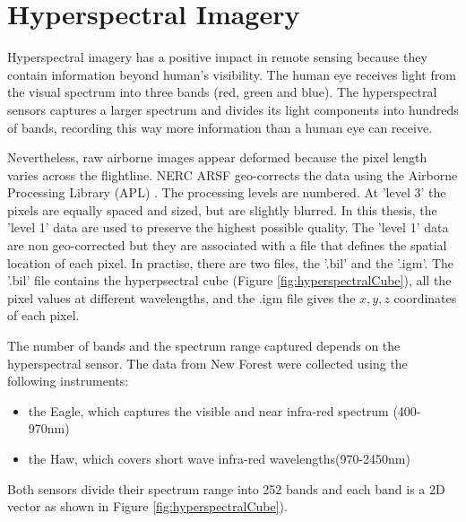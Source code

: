 \documentclass{subfiles}
\begin{document}
	\section{Hyperspectral Imagery}\label{sec:HyperspectralImages}
	\par Hyperspectral imagery has a positive impact in remote sensing because they contain information beyond human's visibility. The human eye receives light from the visual spectrum into three bands (red, green and blue). The hyperspectral sensors captures a larger spectrum and divides its light components into hundreds of bands, recording this way more information than a human eye can receive\cite{Smith2012}. 
	
	\par Nevertheless, raw airborne images  appear deformed because the pixel length varies across the flightline. NERC ARSF geo-corrects the data using the Airborne Processing Library (APL) \cite{Warren2014}. The processing levels are numbered. At 'level 3' the pixels are equally spaced and sized, but are slightly blurred. In this thesis, the 'level 1' data are used to preserve the highest possible quality. The 'level 1' data are non geo-corrected but they are associated with a file that defines the spatial location of each pixel. In practise, there are two files, the '.bil' and the '.igm'. The '.bil' file contains the hyperpsectral cube (Figure \ref{fig:hyperspectralCube}), all the pixel values at different wavelengths, and the .igm file gives the $x, y, z$ coordinates of each pixel.  
	
	\par The number of bands and the spectrum range captured depends on the hyperspectral sensor. The data from New Forest were collected using the following instruments:
	\begin{itemize}
		\item the Eagle, which captures the visible and near infra-red spectrum (400-970nm)
		\item the Haw, which covers short wave infra-red wavelengths(970-2450nm) 
	\end{itemize}
	Both sensors divide their spectrum range into 252 bands and each band is a 2D vector as shown in Figure \ref{fig:hyperspectralCube}).
	
\end{document}
